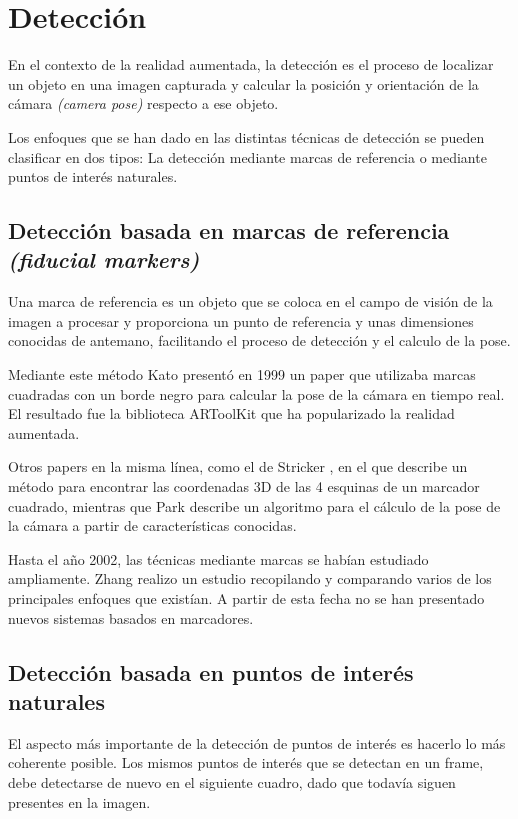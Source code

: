 \section{Detección}
En el contexto de la realidad aumentada, la detección es el proceso de localizar un objeto en una imagen capturada y calcular la posición y orientación de la cámara \emph{(camera pose)} respecto a ese objeto.

Los enfoques que se han dado en las distintas técnicas de detección se pueden clasificar en dos tipos: La detección mediante marcas de referencia o mediante puntos de interés naturales.

\subsection{Detección basada en marcas de referencia \emph{(fiducial markers)}}
Una marca de referencia es un objeto que se coloca en el campo de visión de la imagen a procesar y proporciona un punto de referencia y unas dimensiones conocidas de antemano, facilitando el proceso de detección y el calculo de la pose.

Mediante este método Kato presentó en 1999 un paper que utilizaba marcas cuadradas con un borde negro para calcular la pose de la cámara en tiempo real\cite{Kato}. El resultado fue la biblioteca ARToolKit que ha popularizado la realidad aumentada.

Otros papers en la misma línea, como el de Stricker \cite{Stricker}, en el que describe un método para encontrar las coordenadas 3D de las 4 esquinas de un marcador cuadrado, mientras que Park \cite{Park2} describe un algoritmo para el cálculo de la pose de la cámara a partir de características conocidas.

Hasta el año 2002, las técnicas mediante marcas se habían estudiado ampliamente. Zhang \cite{Zhang} realizo un estudio recopilando y comparando varios de los principales enfoques que existían. A partir de esta fecha no se han presentado nuevos sistemas basados en marcadores.

\subsection{Detección basada en puntos de interés naturales}

El aspecto más importante de la detección de puntos de interés es hacerlo lo más coherente posible. Los mismos puntos de interés que se detectan en un frame, debe detectarse de nuevo en el siguiente cuadro, dado que todavía siguen presentes en la imagen. 

